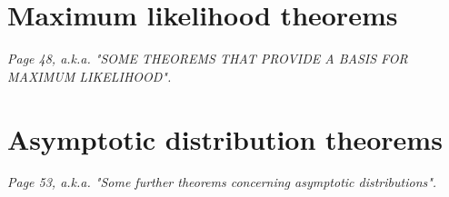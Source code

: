\section{Maximum likelihood theorems}\label{sec:ML thms}

\textit{Page 48, a.k.a. "SOME THEOREMS THAT PROVIDE A BASIS FOR MAXIMUM LIKELIHOOD".}




\section{Asymptotic distribution theorems}\label{sec:asymptotic thms}

\textit{Page 53, a.k.a. "Some further theorems concerning asymptotic distributions".}









